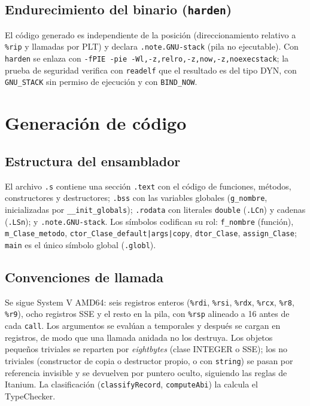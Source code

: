 \documentclass[11pt,a4paper]{article}
\newcommand{\cod}[1]{\texttt{#1}}
\begin{document}
\subsection{Endurecimiento del binario (\cod{harden})}
El código generado es independiente de la posición (direccionamiento relativo a \cod{\%rip} y llamadas por PLT) y
declara \cod{.note.GNU-stack} (pila no ejecutable). Con \cod{harden} se enlaza con
\cod{-fPIE -pie -Wl,-z,relro,-z,now,-z,noexecstack}; la prueba de seguridad verifica con \cod{readelf} que el
resultado es del tipo DYN, con \cod{GNU\_STACK} sin permiso de ejecución y con \cod{BIND\_NOW}.

\section{Generación de código}
\label{sec:gen}
\subsection{Estructura del ensamblador}
El archivo \cod{.s} contiene una sección \cod{.text} con el código de funciones, métodos, constructores y
destructores; \cod{.bss} con las variables globales (\cod{g\_nombre}, inicializadas por \cod{\_\_init\_globals});
\cod{.rodata} con literales \cod{double} (\cod{.LCn}) y cadenas (\cod{.LSn}); y \cod{.note.GNU-stack}. Los símbolos
codifican su rol: \cod{f\_nombre} (función), \cod{m\_Clase\_metodo}, \cod{ctor\_Clase\_default|args|copy},
\cod{dtor\_Clase}, \cod{assign\_Clase}; \cod{main} es el único símbolo global (\cod{.globl}).

\subsection{Convenciones de llamada}
Se sigue System V AMD64: seis registros enteros (\cod{\%rdi}, \cod{\%rsi}, \cod{\%rdx}, \cod{\%rcx}, \cod{\%r8}, \cod{\%r9}),
ocho registros SSE y el resto en la pila, con \cod{\%rsp} alineado a 16 antes de cada \cod{call}. Los argumentos se
evalúan a temporales y después se cargan en registros, de modo que una llamada anidada no los destruya. Los
objetos pequeños triviales se reparten por \emph{eightbytes} (clase INTEGER o SSE); los no triviales
(constructor de copia o destructor propio, o con \cod{string}) se pasan por referencia invisible y se devuelven por
puntero oculto, siguiendo las reglas de Itanium. La clasificación (\cod{classifyRecord}, \cod{computeAbi}) la
calcula el TypeChecker.
\end{document}
